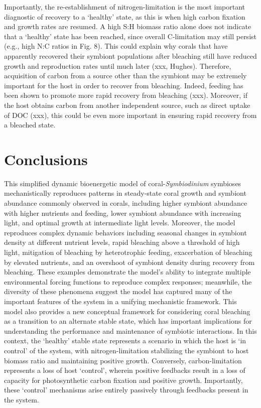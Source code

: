 \documentclass[]{elsarticle} %
\begin{document}
Importantly, the re-establishment of nitrogen-limitation is the most
important diagnostic of recovery to a `healthy' state, as this is when
high carbon fixation and growth rates are resumed. A high S:H biomass
ratio alone does not indicate that a `healthy' state has been reached,
since overall C-limitation may still persist (e.g., high N:C ratios in
Fig. 8). This could explain why corals that have apparently recovered
their symbiont populations after bleaching still have reduced growth and
reproduction rates until much later (xxx, Hughes). Therefore,
acquisition of carbon from a source other than the symbiont may be
extremely important for the host in order to recover from bleaching.
Indeed, feeding has been shown to promote more rapid recovery from
bleaching (xxx). Moreover, if the host obtains carbon from another
independent source, such as direct uptake of DOC (xxx), this could be
even more important in ensuring rapid recovery from a bleached state.

\section{Conclusions}\label{conclusions}

This simplified dynamic bioenergetic model of coral-\emph{Symbiodinium}
symbioses mechanistically reproduces patterns in steady-state coral
growth and symbiont abundance commonly observed in corals, including
higher symbiont abundance with higher nutrients and feeding, lower
symbiont abundance with increasing light, and optimal growth at
intermediate light levels. Moreover, the model reproduces complex
dynamic behaviors including seasonal changes in symbiont density at
different nutrient levels, rapid bleaching above a threshold of high
light, mitigation of bleaching by heterotrophic feeding, exacerbation of
bleaching by elevated nutrients, and an overshoot of symbiont density
during recovery from bleaching. These examples demonstrate the model's
ability to integrate multiple environmental forcing functions to
reproduce complex responses; meanwhile, the diversity of these phenomena
suggest the model has captured many of the important features of the
system in a unifying mechanistic framework. This model also provides a
new conceptual framework for considering coral bleaching as a transition
to an alternate stable state, which has important implications for
understanding the performance and maintenance of symbiotic interactions.
In this context, the `healthy' stable state represents a scenario in
which the host is `in control' of the system, with nitrogen-limitation
stabilizing the symbiont to host biomass ratio and maintaining positive
growth. Conversely, carbon-limitation represents a loss of host
`control', wherein positive feedbacks result in a loss of capacity for
photosynthetic carbon fixation and positive growth. Importantly, these
`control' mechanisms arise entirely passively through feedbacks present
in the system.
\end{document}
